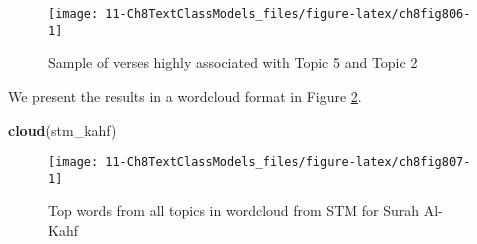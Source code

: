 \documentclass[
]{article}
\newenvironment{Shaded}{\begin{snugshade}}{\end{snugshade}}
\newcommand{\AttributeTok}[1]{\textcolor[rgb]{0.13,0.29,0.53}{#1}}
\newcommand{\DecValTok}[1]{\textcolor[rgb]{0.00,0.00,0.81}{#1}}
\newcommand{\FunctionTok}[1]{\textcolor[rgb]{0.13,0.29,0.53}{\textbf{#1}}}
\newcommand{\NormalTok}[1]{#1}
\newcommand{\OtherTok}[1]{\textcolor[rgb]{0.56,0.35,0.01}{#1}}
\newcommand{\SpecialCharTok}[1]{\textcolor[rgb]{0.81,0.36,0.00}{\textbf{#1}}}
\newcommand{\StringTok}[1]{\textcolor[rgb]{0.31,0.60,0.02}{#1}}
\begin{document}
\begin{Shaded}
\end{Shaded}

\begin{figure}

{\centering \texttt{[image: 11-Ch8TextClassModels\_files/figure-latex/ch8fig806-1]} 

}

\caption{Sample of verses highly associated with Topic 5 and Topic 2}\label{fig:ch8fig806}
\end{figure}

We present the results in a wordcloud format in Figure \ref{fig:ch8fig807}.

\begin{Shaded}
\begin{Highlighting}[]
\FunctionTok{cloud}\NormalTok{(stm\_kahf)}
\end{Highlighting}
\end{Shaded}

\begin{figure}

{\centering \texttt{[image: 11-Ch8TextClassModels\_files/figure-latex/ch8fig807-1]} 

}

\caption{Top words from all topics in wordcloud from STM for Surah Al-Kahf}\label{fig:ch8fig807}
\end{figure}
\end{document}
